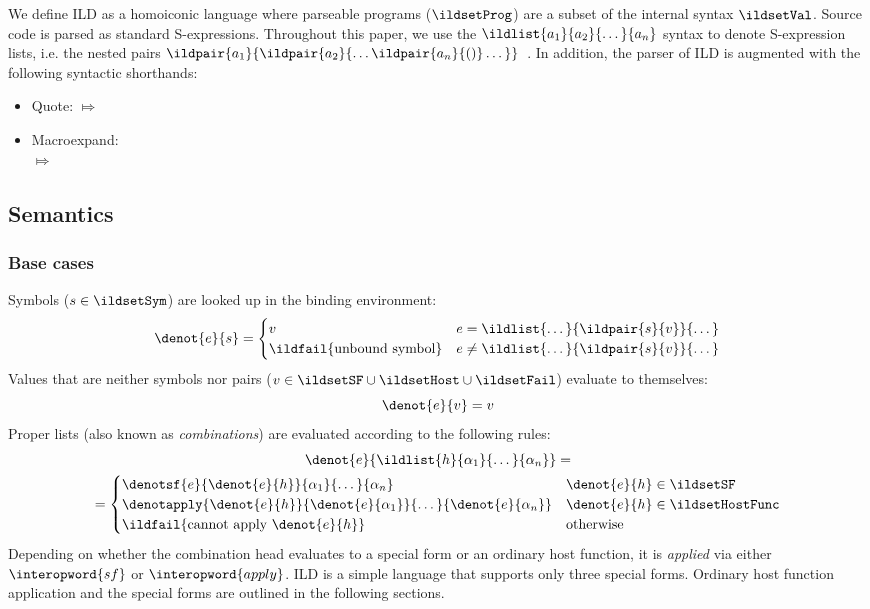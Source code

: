 We define ILD as a homoiconic language where parseable programs (\(\ildsetProg\))
are a subset of the internal syntax \(\ildsetVal\). Source code is parsed as
standard S-expressions. Throughout this paper, we use the \(\ildlist{a_1}{a_2}{\dots}{a_n}\)
syntax to denote S-expression lists, i.e. the nested pairs
\(\ildpair{a_1}{\ildpair{a_2}{\dots \ildpair{a_n}{()} \dots}}\)~\cite{sexp}.
In addition, the parser of ILD is augmented with the following syntactic shorthands:
\begin{itemize}
  \item Quote:  \(\Mapsto\) 
  \item Macroexpand: \\
     \(\Mapsto\) \\
\end{itemize}

\subsection{Semantics}
\label{semantics}

\subsubsection{Base cases}
Symbols (\( s \in \ildsetSym \)) are looked up in the binding environment:
\[
  \denot{e}{s} = \begin{cases}
      v & e = \ildlist{\dots}{\ildpair{s}{v}}{\dots} \\
      \ildfail{\text{unbound symbol}} & e \neq \ildlist{\dots}{\ildpair{s}{v}}{\dots} \\
    \end{cases}
\]
Values that are neither symbols nor pairs (\(v \in \ildsetSF \cup \ildsetHost \cup \ildsetFail\))
evaluate to themselves:
\[
  \denot{e}{v} = v
\]
Proper lists (also known as \emph{combinations}) are evaluated according to the following rules:
\[
  \begin{gathered}
  \denot{e}{\ildlist{h}{\alpha_1}{\dots}{\alpha_n}} = \\
  = \begin{cases}
      \denotsf{e}{\denot{e}{h}}{\alpha_1}{\dots}{\alpha_n} & \denot{e}{h} \in \ildsetSF \\
      \denotapply{\denot{e}{h}}{\denot{e}{\alpha_1}}{\dots}{\denot{e}{\alpha_n}} & \denot{e}{h} \in \ildsetHostFunc \\
      \ildfail{\text{cannot apply }\denot{e}{h}} & \text{otherwise} \\
    \end{cases}
  \end{gathered}
\]
Depending on whether the combination head evaluates to a special form or an ordinary
host function, it is \emph{applied} via either \(\interopword{sf}\) or \(\interopword{apply}\).
ILD is a simple language that supports only three special forms.
Ordinary host function application and the special forms are outlined in the following sections.
